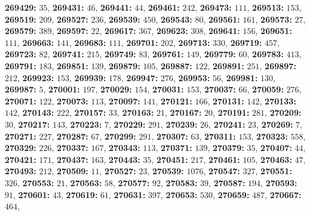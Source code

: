 \textsf{\bfseries 269429:} $35$, \textsf{\bfseries 269431:} $46$, \textsf{\bfseries 269441:} $44$, \textsf{\bfseries 269461:} $242$, \textsf{\bfseries 269473:} $111$, \textsf{\bfseries 269513:} $153$, \textsf{\bfseries 269519:} $209$, \textsf{\bfseries 269527:} $236$, \textsf{\bfseries 269539:} $450$, \textsf{\bfseries 269543:} $80$, \textsf{\bfseries 269561:} $161$, \textsf{\bfseries 269573:} $27$, \textsf{\bfseries 269579:} $389$, \textsf{\bfseries 269597:} $22$, \textsf{\bfseries 269617:} $367$, \textsf{\bfseries 269623:} $308$, \textsf{\bfseries 269641:} $156$, \textsf{\bfseries 269651:} $111$, \textsf{\bfseries 269663:} $141$, \textsf{\bfseries 269683:} $111$, \textsf{\bfseries 269701:} $202$, \textsf{\bfseries 269713:} $330$, \textsf{\bfseries 269719:} $457$, \textsf{\bfseries 269723:} $82$, \textsf{\bfseries 269741:} $215$, \textsf{\bfseries 269749:} $83$, \textsf{\bfseries 269761:} $149$, \textsf{\bfseries 269779:} $60$, \textsf{\bfseries 269783:} $413$, \textsf{\bfseries 269791:} $183$, \textsf{\bfseries 269851:} $139$, \textsf{\bfseries 269879:} $105$, \textsf{\bfseries 269887:} $122$, \textsf{\bfseries 269891:} $251$, \textsf{\bfseries 269897:} $212$, \textsf{\bfseries 269923:} $153$, \textsf{\bfseries 269939:} $178$, \textsf{\bfseries 269947:} $276$, \textsf{\bfseries 269953:} $56$, \textsf{\bfseries 269981:} $130$, \textsf{\bfseries 269987:} $5$, \textsf{\bfseries 270001:} $197$, \textsf{\bfseries 270029:} $154$, \textsf{\bfseries 270031:} $153$, \textsf{\bfseries 270037:} $66$, \textsf{\bfseries 270059:} $276$, \textsf{\bfseries 270071:} $122$, \textsf{\bfseries 270073:} $113$, \textsf{\bfseries 270097:} $141$, \textsf{\bfseries 270121:} $166$, \textsf{\bfseries 270131:} $142$, \textsf{\bfseries 270133:} $142$, \textsf{\bfseries 270143:} $222$, \textsf{\bfseries 270157:} $33$, \textsf{\bfseries 270163:} $21$, \textsf{\bfseries 270167:} $20$, \textsf{\bfseries 270191:} $281$, \textsf{\bfseries 270209:} $30$, \textsf{\bfseries 270217:} $143$, \textsf{\bfseries 270223:} $7$, \textsf{\bfseries 270229:} $291$, \textsf{\bfseries 270239:} $26$, \textsf{\bfseries 270241:} $23$, \textsf{\bfseries 270269:} $7$, \textsf{\bfseries 270271:} $227$, \textsf{\bfseries 270287:} $67$, \textsf{\bfseries 270299:} $291$, \textsf{\bfseries 270307:} $63$, \textsf{\bfseries 270311:} $153$, \textsf{\bfseries 270323:} $558$, \textsf{\bfseries 270329:} $226$, \textsf{\bfseries 270337:} $167$, \textsf{\bfseries 270343:} $113$, \textsf{\bfseries 270371:} $139$, \textsf{\bfseries 270379:} $35$, \textsf{\bfseries 270407:} $44$, \textsf{\bfseries 270421:} $171$, \textsf{\bfseries 270437:} $163$, \textsf{\bfseries 270443:} $35$, \textsf{\bfseries 270451:} $217$, \textsf{\bfseries 270461:} $105$, \textsf{\bfseries 270463:} $47$, \textsf{\bfseries 270493:} $212$, \textsf{\bfseries 270509:} $11$, \textsf{\bfseries 270527:} $23$, \textsf{\bfseries 270539:} $1076$, \textsf{\bfseries 270547:} $327$, \textsf{\bfseries 270551:} $326$, \textsf{\bfseries 270553:} $21$, \textsf{\bfseries 270563:} $58$, \textsf{\bfseries 270577:} $92$, \textsf{\bfseries 270583:} $39$, \textsf{\bfseries 270587:} $194$, \textsf{\bfseries 270593:} $91$, \textsf{\bfseries 270601:} $43$, \textsf{\bfseries 270619:} $61$, \textsf{\bfseries 270631:} $397$, \textsf{\bfseries 270653:} $530$, \textsf{\bfseries 270659:} $487$, \textsf{\bfseries 270667:} $464$, 
